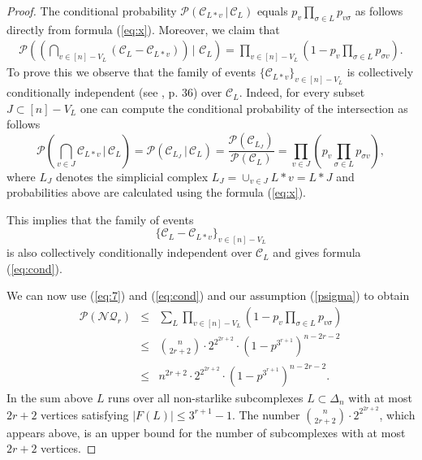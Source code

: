 \documentclass[10pt,a4paper]{amsart}
\begin{document}
\begin{proof}
The conditional probability $\mathcal P(\mathcal C_{L\ast v} \, |\, \mathcal C_L)$ equals 
$
p_v \prod_{\sigma\in L}p_{v\sigma}
$
as follows directly from formula (\ref{eq:x}). 
Moreover, we claim that 
\begin{eqnarray}\label{eq:cond}
\mathcal P\left(\left(\bigcap_{v\in [n]-V_L}(\mathcal C_{L}-\mathcal C_{L\ast v})\right)\, |\, \,  \mathcal C_L\right)= \prod_{v\in [n]-V_L}\left( 1- p_v\prod_{\sigma\in L}p_{\sigma v}\right).
\end{eqnarray}
To prove this we observe that the family of events $\{\mathcal C_{L\ast v}\}_{v\in [n]-V_L}$ is collectively conditionally independent 
(see \cite{Shi}, p. 36) over $\mathcal C_L$. 
Indeed, for every subset $J\subset [n]-V_L$  one can compute
the conditional probability of the intersection as follows
$$
\mathcal P\left(\bigcap_{v\in J}\mathcal C_{L\ast v}\, |\, \mathcal C_L\right)= \mathcal P(\mathcal C_{L_J}\, | \, \mathcal C_L)= \frac{\mathcal P(\mathcal C_{L_J})}{
\mathcal P( \mathcal C_L)}=
\prod_{v\in J}\left( p_v\prod_{\sigma\in L}p_{\sigma v}\right),
$$
where $L_J$ denotes the simplicial complex $L_J=\cup_{v\in J} L\ast v=L\ast J$ and probabilities above are calculated using the formula (\ref{eq:x}). 

This implies that the family of events $$\{\mathcal C_L -\mathcal C_{L\ast v}\}_{v\in [n]-V_L}$$
is also collectively conditionally independent over $\mathcal C_L$ and gives formula (\ref{eq:cond}). 

We can now use (\ref{eq:7}) and (\ref{eq:cond}) and our assumption (\ref{psigma}) to obtain
\begin{eqnarray}\label{eq:9}
\mathcal P(\mathcal {NQ}_r)&\le& \sum_L \prod_{v\in [n]-V_L} (1-p_v\prod_{\sigma\in L}p_{v\sigma})\nonumber\\
&\le & \binom n {2r+2} \cdot 2^{2^{2r+2}}\cdot (1- p^{3^{r+1}})^{n-2r-2}\nonumber\\
&\le & n^{2r+2}\cdot 2^{2^{2r+2}} \cdot 
(1-p^{3^{r+1}})^{n-2r-2}.
\end{eqnarray}
In the sum above $L$ runs over all non-starlike subcomplexes $L\subset \Delta_n$ with at most $2r+2$ vertices satisfying $|F(L)|\le 3^{r+1}-1$. 
The number $\binom{n}{2r+2}\cdot 2^{2^{2r+2}}$, which appears above, is an upper bound for the number of subcomplexes with at most $2r+2$ vertices.



\end{proof}
\end{document}
